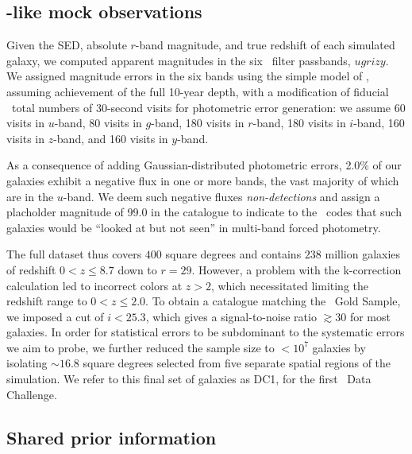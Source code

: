 \subsection{\lsst-like mock observations}

Given the SED, absolute $r$-band magnitude, and true redshift of each simulated galaxy, we computed apparent magnitudes in the six \lsst\ filter passbands, $ugrizy$.
We assigned magnitude errors in the six bands using the simple model of \citet{ivezic_lsst:_2008}, assuming achievement of the full 10-year depth, with a modification of fiducial \lsst\ total numbers of 30-second visits for photometric error generation: we assume 60 visits in $u$-band, 80 visits in $g$-band, 180 visits in $r$-band, 180 visits in $i$-band, 160 visits in $z$-band, and 160 visits in $y$-band.

As a consequence of adding Gaussian-distributed photometric errors, 2.0\% of our galaxies exhibit a negative flux in one or more bands, the vast majority of which are in the $u$-band.
We deem such negative fluxes \textit{non-detections} and assign a placholder magnitude of 99.0 in the catalogue to indicate to the \pzpdf\ codes that such galaxies would be ``looked at but not seen'' in multi-band forced photometry.

The full dataset thus covers $400$ square degrees and contains $238$ million galaxies of redshift $0 < z \leq 8.7$ down to $r = 29$.
However, a problem with the k-correction calculation led to incorrect colors at $z>2$, which necessitated limiting the redshift range to $0 < z \leq 2.0$.
To obtain a catalogue matching the \lsst\ Gold Sample, we imposed a cut of $i < 25.3$, which gives a signal-to-noise ratio $\gtrsim 30$ for most galaxies.
In order for statistical errors to be subdominant to the systematic errors we aim to probe, we further reduced the sample size to $<10^{7}$ galaxies by isolating $\sim 16.8$ square degrees selected from five separate spatial regions of the simulation.
We refer to this final set of galaxies as DC1, for the first \desc\ Data Challenge.

\subsection{Shared prior information}

